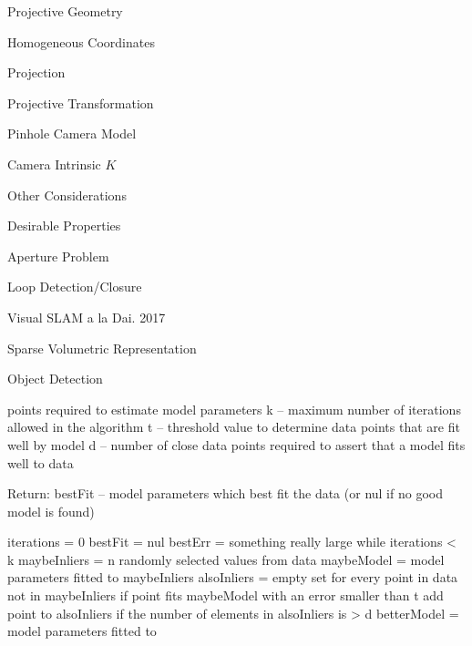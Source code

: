 \begin{section}
\begin{subsubsection}
\begin{subsubsection}
\begin{subsubsection}
\begin{section}{Projective Geometry}
\begin{subsection}{Homogeneous Coordinates}
\begin{subsubsection}
{\begin{subsubsection}{Projection}
\begin{subsubsection}{Projective Transformation}
\begin{subsection}
\begin{subsubsection}
\begin{subsubsection}
\begin{subsubsection}
{\begin{subsubsection}
\begin{subsection}
\begin{subsection} {Pinhole Camera Model}
\begin{subsection} {Camera Intrinsic $K$}
\begin{subsection}
\begin{subsection}
\begin{subsubsection}{Other Considerations}
{\begin{subsection}
\begin{subsubsection}{Desirable Properties}
\begin{section}
\begin{subsection}
\begin{subsection}
\begin{subsection}
\begin{section}
\begin{subsection}
\begin{subsubsection}
\begin{subsubsection}
\begin{subsection}
\begin{section}
\begin{subsection}
\begin{subsubsection}{Aperture Problem}
\begin{subsubsection}
{\begin{section}
\begin{subsubsection}
\begin{subsubsection}
\begin{subsubsection}
\begin{subsection}
\begin{subsection}
\begin{subsection}
\begin{subsection}
\begin{subsection}
\begin{subsection}
\begin{subsection}
\begin{subsubsection}
{\begin{subsubsection}
{\begin{subsubsection}
\begin{section}
\begin{section}
\begin{section}
\begin{subsubsection}
\begin{subsubsection}{Loop Detection/Closure}
\begin{subsubsection}{Visual SLAM a la Dai. 2017}
\begin{subsubsection}{Sparse Volumetric Representation}
\begin{subsection}
\begin{section}{Object Detection}
\begin{subsubsection}
{\begin{subsection}
\begin{subsection}
\begin{section}
\begin{section}
\begin{subsection}
\begin{subsubsection}
\begin{subsubsection}
\begin{subsection}
\begin{subsection}
\begin{subsubsection}
\begin{subsubsection}
\begin{subsubsection}
{\begin{subsection}
\begin{subsection}
\begin{subsection}
\begin{subsection}
\begin{section}
\begin{subsection}
\begin{subsubsection}
\begin{subsubsection}
\begin{subsubsection}
\begin{subsubsection}
\begin{subsubsection}
\begin{subsubsection}
\begin{subsection}
\begin{subsubsection}
\begin{subsection}
\begin{subsection}
\begin{subsubsection}
\begin{subsubsection}
\begin{subsection}
\begin{subsubsection}
{{\begin{section}
\begin{section}
\begin{subsection}
{{{\begin{subsubsection}
\begin{subsubsection}
\begin{subsection}
{\begin{section}
points required to estimate model parameters
    k – maximum number of iterations allowed in the algorithm
    t – threshold value to determine data points that are fit well by model 
    d – number of close data points required to assert that a model fits well to data

Return:
    bestFit – model parameters which best fit the data (or nul if no good model is found)

iterations = 0
bestFit = nul
bestErr = something really large
while iterations < k {
    maybeInliers = n randomly selected values from data
    maybeModel = model parameters fitted to maybeInliers
    alsoInliers = empty set
    for every point in data not in maybeInliers {
        if point fits maybeModel with an error smaller than t
             add point to alsoInliers
    }
    if the number of elements in alsoInliers is > d {
        betterModel = model parameters fitted to }}
\end{section}}
\end{subsection}
\end{subsubsection}
\end{subsubsection}}}}
\end{subsection}
\end{section}
\end{section}}}
\end{subsubsection}
\end{subsection}
\end{subsubsection}
\end{subsubsection}
\end{subsection}
\end{subsection}
\end{subsubsection}
\end{subsection}
\end{subsubsection}
\end{subsubsection}
\end{subsubsection}
\end{subsubsection}
\end{subsubsection}
\end{subsubsection}
\end{subsection}
\end{section}
\end{subsection}
\end{subsection}
\end{subsection}
\end{subsection}}
\end{subsubsection}
\end{subsubsection}
\end{subsubsection}
\end{subsection}
\end{subsection}
\end{subsubsection}
\end{subsubsection}
\end{subsection}
\end{section}
\end{section}
\end{subsection}
\end{subsection}}
\end{subsubsection}
\end{section}
\end{subsection}
\end{subsubsection}
\end{subsubsection}
\end{subsubsection}
\end{subsubsection}
\end{section}
\end{section}
\end{section}
\end{subsubsection}}
\end{subsubsection}}
\end{subsubsection}
\end{subsection}
\end{subsection}
\end{subsection}
\end{subsection}
\end{subsection}
\end{subsection}
\end{subsection}
\end{subsubsection}
\end{subsubsection}
\end{subsubsection}
\end{section}}
\end{subsubsection}
\end{subsubsection}
\end{subsection}
\end{section}
\end{subsection}
\end{subsubsection}
\end{subsubsection}
\end{subsection}
\end{section}
\end{subsection}
\end{subsection}
\end{subsection}
\end{section}
\end{subsubsection}
\end{subsection}}
\end{subsubsection}
\end{subsection}
\end{subsection}
\end{subsection}
\end{subsection}
\end{subsection}
\end{subsubsection}}
\end{subsubsection}
\end{subsubsection}
\end{subsubsection}
\end{subsection}
\end{subsubsection}
\end{subsubsection}}
\end{subsubsection}
\end{subsection}
\end{section}
\end{subsubsection}
\end{subsubsection}
\end{subsubsection}
\end{section}
